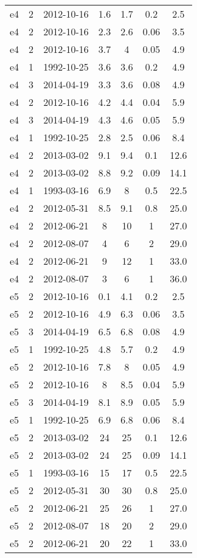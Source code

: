 \begin{table*}[htp]
\begin{tabular}{ccccccc}
e4 & 2 & 2012-10-16 & 1.6 & 1.7 & 0.2 & 2.5 \\
e4 & 2 & 2012-10-16 & 2.3 & 2.6 & 0.06 & 3.5 \\
e4 & 2 & 2012-10-16 & 3.7 & 4 & 0.05 & 4.9 \\
e4 & 1 & 1992-10-25 & 3.6 & 3.6 & 0.2 & 4.9 \\
e4 & 3 & 2014-04-19 & 3.3 & 3.6 & 0.08 & 4.9 \\
e4 & 2 & 2012-10-16 & 4.2 & 4.4 & 0.04 & 5.9 \\
e4 & 3 & 2014-04-19 & 4.3 & 4.6 & 0.05 & 5.9 \\
e4 & 1 & 1992-10-25 & 2.8 & 2.5 & 0.06 & 8.4 \\
e4 & 2 & 2013-03-02 & 9.1 & 9.4 & 0.1 & 12.6 \\
e4 & 2 & 2013-03-02 & 8.8 & 9.2 & 0.09 & 14.1 \\
e4 & 1 & 1993-03-16 & 6.9 & 8 & 0.5 & 22.5 \\
e4 & 2 & 2012-05-31 & 8.5 & 9.1 & 0.8 & 25.0 \\
e4 & 2 & 2012-06-21 & 8 & 10 & 1 & 27.0 \\
e4 & 2 & 2012-08-07 & 4 & 6 & 2 & 29.0 \\
e4 & 2 & 2012-06-21 & 9 & 12 & 1 & 33.0 \\
e4 & 2 & 2012-08-07 & 3 & 6 & 1 & 36.0 \\
e5 & 2 & 2012-10-16 & 0.1 & 4.1 & 0.2 & 2.5 \\
e5 & 2 & 2012-10-16 & 4.9 & 6.3 & 0.06 & 3.5 \\
e5 & 3 & 2014-04-19 & 6.5 & 6.8 & 0.08 & 4.9 \\
e5 & 1 & 1992-10-25 & 4.8 & 5.7 & 0.2 & 4.9 \\
e5 & 2 & 2012-10-16 & 7.8 & 8 & 0.05 & 4.9 \\
e5 & 2 & 2012-10-16 & 8 & 8.5 & 0.04 & 5.9 \\
e5 & 3 & 2014-04-19 & 8.1 & 8.9 & 0.05 & 5.9 \\
e5 & 1 & 1992-10-25 & 6.9 & 6.8 & 0.06 & 8.4 \\
e5 & 2 & 2013-03-02 & 24 & 25 & 0.1 & 12.6 \\
e5 & 2 & 2013-03-02 & 24 & 25 & 0.09 & 14.1 \\
e5 & 1 & 1993-03-16 & 15 & 17 & 0.5 & 22.5 \\
e5 & 2 & 2012-05-31 & 30 & 30 & 0.8 & 25.0 \\
e5 & 2 & 2012-06-21 & 25 & 26 & 1 & 27.0 \\
e5 & 2 & 2012-08-07 & 18 & 20 & 2 & 29.0 \\
e5 & 2 & 2012-06-21 & 20 & 22 & 1 & 33.0 \\

\end{tabular}
\end{table*}
